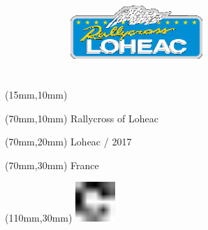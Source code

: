 \null\newpage
\begin{textblock*}{50mm}(15mm,10mm)%
\includegraphics[width=50mm]{LG/LOH.png}
\end{textblock*}
\begin{textblock*}{130mm}(70mm,10mm)%
{\fontsize{20}{20}\selectfont Rallycross of Loheac}\\
\end{textblock*}
\begin{textblock*}{120mm}(70mm,20mm)%
{\fontsize{16}{16}\selectfont Loheac / 2017}\\
\end{textblock*}
\begin{textblock*}{120mm}(70mm,30mm)%
{\fontsize{12}{12}\selectfont France}
\end{textblock*}
\begin{textblock*}{30mm}(110mm,30mm)%
\centering
\includegraphics[height=15mm]{icons/fa-rotate-right.pdf}
\end{textblock*}
